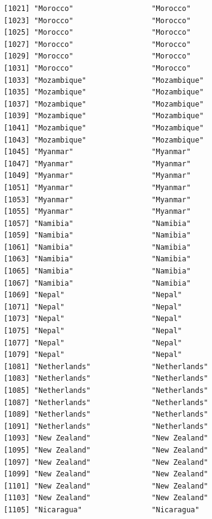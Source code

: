 \documentclass[
  letterpaper,
  DIV=11,
  numbers=noendperiod]{scrreprt}
\begin{document}
\begin{verbatim}
[1021] "Morocco"                  "Morocco"                 
[1023] "Morocco"                  "Morocco"                 
[1025] "Morocco"                  "Morocco"                 
[1027] "Morocco"                  "Morocco"                 
[1029] "Morocco"                  "Morocco"                 
[1031] "Morocco"                  "Morocco"                 
[1033] "Mozambique"               "Mozambique"              
[1035] "Mozambique"               "Mozambique"              
[1037] "Mozambique"               "Mozambique"              
[1039] "Mozambique"               "Mozambique"              
[1041] "Mozambique"               "Mozambique"              
[1043] "Mozambique"               "Mozambique"              
[1045] "Myanmar"                  "Myanmar"                 
[1047] "Myanmar"                  "Myanmar"                 
[1049] "Myanmar"                  "Myanmar"                 
[1051] "Myanmar"                  "Myanmar"                 
[1053] "Myanmar"                  "Myanmar"                 
[1055] "Myanmar"                  "Myanmar"                 
[1057] "Namibia"                  "Namibia"                 
[1059] "Namibia"                  "Namibia"                 
[1061] "Namibia"                  "Namibia"                 
[1063] "Namibia"                  "Namibia"                 
[1065] "Namibia"                  "Namibia"                 
[1067] "Namibia"                  "Namibia"                 
[1069] "Nepal"                    "Nepal"                   
[1071] "Nepal"                    "Nepal"                   
[1073] "Nepal"                    "Nepal"                   
[1075] "Nepal"                    "Nepal"                   
[1077] "Nepal"                    "Nepal"                   
[1079] "Nepal"                    "Nepal"                   
[1081] "Netherlands"              "Netherlands"             
[1083] "Netherlands"              "Netherlands"             
[1085] "Netherlands"              "Netherlands"             
[1087] "Netherlands"              "Netherlands"             
[1089] "Netherlands"              "Netherlands"             
[1091] "Netherlands"              "Netherlands"             
[1093] "New Zealand"              "New Zealand"             
[1095] "New Zealand"              "New Zealand"             
[1097] "New Zealand"              "New Zealand"             
[1099] "New Zealand"              "New Zealand"             
[1101] "New Zealand"              "New Zealand"             
[1103] "New Zealand"              "New Zealand"             
[1105] "Nicaragua"                "Nicaragua"               

\end{verbatim}
\end{document}
